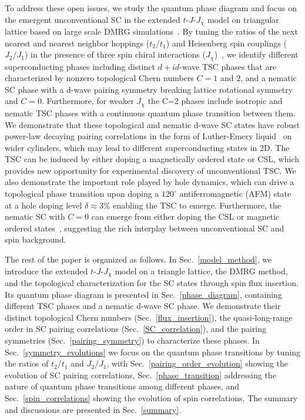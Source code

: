 \documentclass[aps,prx,reprint,superscriptaddress,showpacs]{revtex4-2}
\newcommand{\oim}[1]{{\color{blue} #1}}
\begin{document}
To address these open issues, we study the quantum phase diagram and focus on the emergent unconventional SC in the  extended $t$-$J$-$J_{\chi}$ model on triangular lattice  based on large scale DMRG simulations~\cite{white1992density}.  
By tuning the ratios of the next nearest and  nearest neighbor hoppings ($t_{2}/t_{1}$) and Heisenberg spin couplings ($J_{2}/J_{1}$) in the presence of  three spin chiral interactions ($J_{\chi}$)~\cite{jiang2020topological}, 
\oim{we identify different superconducting phases
including  distinct $d+id$-wave TSC phases that are characterized by nonzero topological Chern numbers  $C=1$ and $2$, and a nematic SC phase with a d-wave pairing symmetry breaking lattice rotational symmetry and $C=0$. Furthermore, 
for weaker $J_{\chi }$ the C=2 phases include isotropic and nematic TSC phases  with a continuous quantum phase transition between them.
We demonstrate that these  topological and  nematic d-wave SC states have robust power-law decaying  pairing correlations in the form of Luther-Emery liquid~\cite{luther1974backward}  on wider cylinders, which may lead to different superconducting states in 2D. }
The TSC can be induced by either doping a magnetically ordered state or CSL, which provides new opportunity for experimental discovery of unconventional TSC. We also demonstrate  the important role played by hole dynamics, which  can drive a topological phase transition upon doping a $120^{\circ}$ antiferromagnetic (AFM) state at a hole doping level $\delta\approx 3\%$  enabling the  TSC to emerge.  Furthermore, the nematic SC with $C=0$  
can emerge from either doping the CSL or magnetic ordered states~\cite{gong2017global}, suggesting  the rich interplay between unconventional SC and spin background.

\oim{The rest of the paper is organized as follows. In Sec.~\ref{model_method}, we introduce the extended $t$-$J$-$J_{\chi}$ model on a triangle lattice, the DMRG method, and the topological characterization for the SC states through spin flux insertion. Its quantum phase diagram is presented in Sec.~\ref{phase_diagram}, containing different TSC phases and a nematic d-wave SC phase. We demonstrate their distinct topological Chern numbers (Sec.~\ref{flux_insertion}), the quasi-long-range order in SC pairing correlations (Sec.~\ref{SC_correlation}), and the pairing symmetries (Sec.~\ref{pairing_symmetry}) to  characterize these  phases. In Sec.~\ref{symmetry_evolutions} we focus on the quantum phase transitions by tuning the ratios of $t_{2}/t_{1}$ and $J_{2}/J_{1}$, with Sec.~\ref{pairing_order_evolution} showing the evolution of SC pairing correlations, Sec.~\ref{phase_transition} addressing the nature of quantum phase transitions among different phases, and Sec.~\ref{spin_correlations} showing the evolution of spin correlations. The summary and discussions are presented in Sec.~\ref{summary}.}
\end{document}
